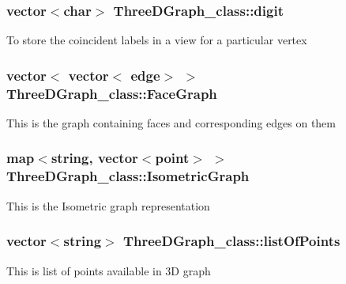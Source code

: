\subsubsection[{\texorpdfstring{digit}{digit}}]{\setlength{\rightskip}{0pt plus 5cm}vector$<$char$>$ Three\+D\+Graph\+\_\+class\+::digit}\hypertarget{classThreeDGraph__class_a70ca0daf8f7348661bb3a429a10cf79a}{}\label{classThreeDGraph__class_a70ca0daf8f7348661bb3a429a10cf79a}
To store the coincident labels in a view for a particular vertex 
\subsubsection[{\texorpdfstring{Face\+Graph}{FaceGraph}}]{\setlength{\rightskip}{0pt plus 5cm}vector$<$ vector$<$ {\bf edge}$>$ $>$ Three\+D\+Graph\+\_\+class\+::\+Face\+Graph}\hypertarget{classThreeDGraph__class_a36fbc76142278359f5de0df528394944}{}\label{classThreeDGraph__class_a36fbc76142278359f5de0df528394944}
This is the graph containing faces and corresponding edges on them 
\subsubsection[{\texorpdfstring{Isometric\+Graph}{IsometricGraph}}]{\setlength{\rightskip}{0pt plus 5cm}map$<$string, vector$<${\bf point}$>$ $>$ Three\+D\+Graph\+\_\+class\+::\+Isometric\+Graph}\hypertarget{classThreeDGraph__class_afa3f00ec2a3864317ad121d087c9896d}{}\label{classThreeDGraph__class_afa3f00ec2a3864317ad121d087c9896d}
This is the Isometric graph representation 
\subsubsection[{\texorpdfstring{list\+Of\+Points}{listOfPoints}}]{\setlength{\rightskip}{0pt plus 5cm}vector$<$string$>$ Three\+D\+Graph\+\_\+class\+::list\+Of\+Points}\hypertarget{classThreeDGraph__class_ab24656328d4be1eae0f6f5742add5969}{}\label{classThreeDGraph__class_ab24656328d4be1eae0f6f5742add5969}
This is list of points available in 3D graph 
